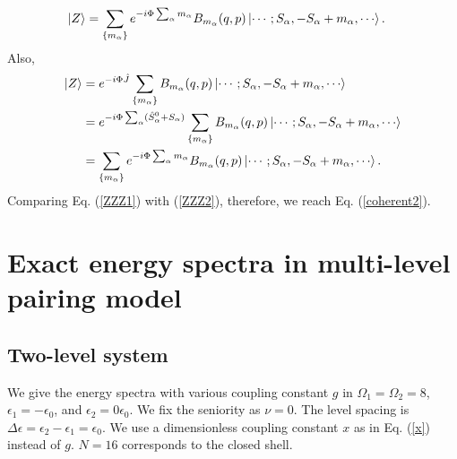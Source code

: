 \documentclass[11pt]{book} %
\begin{document}
\begin{align}
  \ket{Z} &= \sum_{\{m_{\alpha}\}} e^{-i\Phi \sum_\alpha m_{\alpha}} B_{m_{\alpha}}(q,p) \ket{\cdots;S_{\alpha},-S_{\alpha}+m_{\alpha},\cdots}.
\label{ZZZ1}
\end{align}
Also, 
\begin{align}
 \ket{Z} &= e^{-i\Phi \hat{J}} \sum_{\{m_{\alpha}\}} B_{m_{\alpha}}(q,p) \ket{\cdots;S_{\alpha},-S_{\alpha}+m_{\alpha},\cdots} \nonumber \\
 &= e^{-i\Phi \sum_{\alpha} (\hat{S}_{\alpha}^0 + S_{\alpha})} \sum_{\{m_{\alpha}\}} B_{m_{\alpha}}(q,p) \ket{\cdots;S_{\alpha},-S_{\alpha}+m_{\alpha},\cdots} \nonumber \\
  &= \sum_{\{m_{\alpha}\}} e^{-i\Phi \sum_\alpha m_{\alpha}} B_{m_{\alpha}}(q,p) \ket{\cdots;S_{\alpha},-S_{\alpha}+m_{\alpha},\cdots}.
\label{ZZZ2}
\end{align}
Comparing Eq. (\ref{ZZZ1}) with (\ref{ZZZ2}), therefore, we reach Eq. (\ref{coherent2}).


\clearpage{\pagestyle{empty}\cleardoublepage}
\chapter{Exact energy spectra in multi-level pairing model}
\section{Two-level system}
We give the energy spectra with various coupling constant $g$ in $\Omega_1=\Omega_2=8$, $\epsilon_1=-\epsilon_0$, and $\epsilon_2=0\epsilon_0$. We fix the seniority as $\nu=0$. The level spacing is $\Delta\epsilon = \epsilon_2-\epsilon_1 = \epsilon_0$. We use a dimensionless coupling constant $x$ as in Eq. (\ref{x}) instead of $g$. $N=16$ corresponds to the closed shell.
\end{document}
